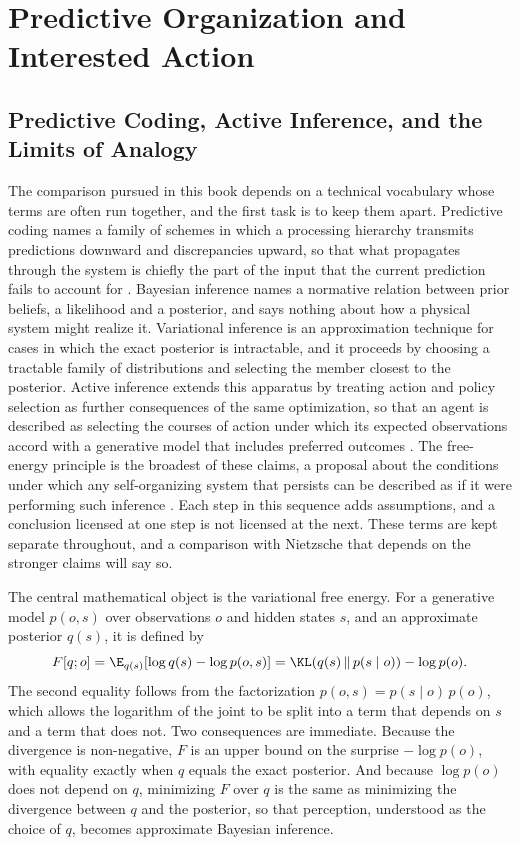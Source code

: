 \part{Predictive Organization and Interested Action}

\chapter{Predictive Coding, Active Inference, and the Limits of Analogy}

The comparison pursued in this book depends on a technical vocabulary whose terms are often run together, and the first task is to keep them apart. Predictive coding names a family of schemes in which a processing hierarchy transmits predictions downward and discrepancies upward, so that what propagates through the system is chiefly the part of the input that the current prediction fails to account for \citep{rao1999}. Bayesian inference names a normative relation between prior beliefs, a likelihood and a posterior, and says nothing about how a physical system might realize it. Variational inference is an approximation technique for cases in which the exact posterior is intractable, and it proceeds by choosing a tractable family of distributions and selecting the member closest to the posterior. Active inference extends this apparatus by treating action and policy selection as further consequences of the same optimization, so that an agent is described as selecting the courses of action under which its expected observations accord with a generative model that includes preferred outcomes \citep{friston2017,parr2022}. The free-energy principle is the broadest of these claims, a proposal about the conditions under which any self-organizing system that persists can be described as if it were performing such inference \citep{friston2010}. Each step in this sequence adds assumptions, and a conclusion licensed at one step is not licensed at the next. These terms are kept separate throughout, and a comparison with Nietzsche that depends on the stronger claims will say so.

The central mathematical object is the variational free energy. For a generative model $p(o,s)$ over observations $o$ and hidden states $s$, and an approximate posterior $q(s)$, it is defined by
\[
F[q;o]
=
\E_{q(s)}\!\left[\log q(s)-\log p(o,s)\right]
=
\KL\!\left(q(s)\,\|\,p(s\mid o)\right)-\log p(o).
\]
The second equality follows from the factorization $p(o,s)=p(s\mid o)\,p(o)$, which allows the logarithm of the joint to be split into a term that depends on $s$ and a term that does not. Two consequences are immediate. Because the divergence is non-negative, $F$ is an upper bound on the surprise $-\log p(o)$, with equality exactly when $q$ equals the exact posterior. And because $\log p(o)$ does not depend on $q$, minimizing $F$ over $q$ is the same as minimizing the divergence between $q$ and the posterior, so that perception, understood as the choice of $q$, becomes approximate Bayesian inference.

